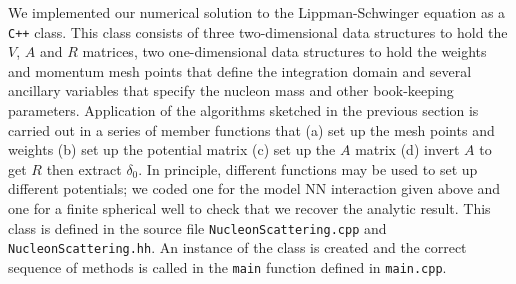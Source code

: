 \documentclass[10pt,showpacs,preprintnumbers,footinbib,amsmath,amssymb,aps,prl,twocolumn,groupedaddress,superscriptaddress,showkeys]{revtex4-1}
\begin{document}
We implemented our numerical solution to the Lippman-Schwinger equation as a \texttt{C++} class.
This class consists of three two-dimensional data structures to hold the $V$, $A$ and $R$ matrices,
two one-dimensional data structures to hold the weights and momentum mesh points that define the
integration domain and several ancillary variables that specify the nucleon mass and other book-keeping
parameters. Application of the algorithms sketched in the previous section is carried out in a series of
member functions that (a) set up the mesh points and weights (b) set up the potential matrix (c) set
up the $A$ matrix (d) invert $A$ to get $R$ then extract $\delta _0$. In principle,
different functions may be used to set up different potentials; we coded one for the model NN interaction
given above and one for a finite spherical well to check that we recover the analytic result.
This class is defined in the source
file \texttt{NucleonScattering.cpp} and \texttt{NucleonScattering.hh}. An instance of the class is
created and the correct sequence of methods is called in the \texttt{main} function defined in
\texttt{main.cpp}.



\end{document}

